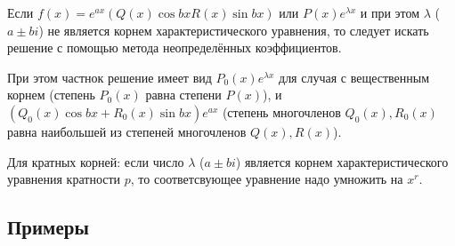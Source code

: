 \documentclass[12pt]{article}
\begin{document}
Если $f(x) = e^{ax}(Q(x)\cos{bx} R(x)\sin{bx})$ или $P(x)e^{\lambda x}$ и при этом $\lambda$ ($a \pm bi$) не является корнем характеристического уравнения, то следует искать решение с помощью метода неопределённых коэффициентов.

При этом частнок решение имеет вид $P_0(x)e^{\lambda x}$ для случая с вещественным корнем (степень $P_0(x)$ равна степени $P(x)$), и $(Q_0(x)\cos{bx} + R_0(x)\sin{bx})e^{ax}$ (степень многочленов $Q_0(x), R_0(x)$ равна наибольшей из степеней многочленов $Q(x), R(x)$).

Для кратных корней: если число $\lambda$ ($a \pm bi$) является корнем характеристического уравнения кратности $p$, то соответсвующее уравнение надо умножить на $x^{r}$.

\subsection{Примеры}
\end{document}

